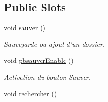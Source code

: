 \subsection*{Public Slots}
\begin{DoxyCompactItemize}
\item 
\hypertarget{class_dossier_window_ace55d79178ee85a8cee7203fc555d65b}{void \hyperlink{class_dossier_window_ace55d79178ee85a8cee7203fc555d65b}{sauver} ()}\label{class_dossier_window_ace55d79178ee85a8cee7203fc555d65b}

\begin{DoxyCompactList}\small\item\em Sauvegarde ou ajout d'un dossier. \end{DoxyCompactList}\item 
void \hyperlink{class_dossier_window_a39e3bf3b53585c4e0619f05ef1cb2ba9}{pbsauver\-Enable} ()
\begin{DoxyCompactList}\small\item\em Activation du bouton Sauver. \end{DoxyCompactList}\item 
\hypertarget{class_dossier_window_a585664fe2ceb7da9b4cc3a250b1bcf51}{void \hyperlink{class_dossier_window_a585664fe2ceb7da9b4cc3a250b1bcf51}{rechercher} ()}\label{class_dossier_window_a585664fe2ceb7da9b4cc3a250b1bcf51}


\end{DoxyCompactItemize}
